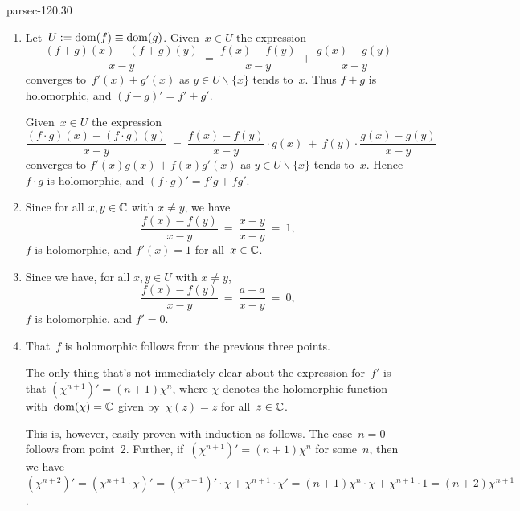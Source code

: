 \documentclass[b5page]{book}
\begin{document}
\begin{solution}{parsec-120.30}
\begin{enumerate}
\item[1.]
Let~$U:= \operatorname{dom}(f)\equiv\operatorname{dom}(g)$.
Given~$x\in U$ the expression
        \begin{equation*}
            \frac{(f+g)(x)-(f+g)(y)}{x-y}
            \ =\  \frac{f(x)-f(y)}{x-y}
            \ +\ \frac{g(x)-g(y)}{x-y}
        \end{equation*}
        converges to~$f'(x)+g'(x)$ as $y\in U\backslash\{x\}$
        tends to~$x$.  
Thus $f+g$ is holomorphic, and $(f+g)'=f'+g'$.

Given~$x\in U$ the expression
\begin{equation*}
            \frac{(f\cdot g)(x)-(f\cdot g)(y)}{x-y}
            \ =\  \frac{f(x)-f(y)}{x-y}\cdot g(x)
            \ +\ f(y)\cdot \frac{g(x)-g(y) }{x-y}
\end{equation*}
converges to $f'(x)g(x)+f(x)g'(x)$ as $y\in U\backslash\{x\}$
tends to~$x$. Hence~$f\cdot g$ is holomorphic, 
        and $(f\cdot g)' = f'g + fg'$.

\item[2.]
Since for all $x,y\in\mathbb{C}$ with $x\neq y$, 
        we have
\begin{equation*}
\frac{f(x)-f(y)}{x-y} \ = \ 
    \frac{x-y}{x-y} \ = \ 1,
\end{equation*}
$f$ is holomorphic, and $f'(x)=1$ for all~$x\in \mathbb{C}$.

\item[3.]
    Since we have, for all $x,y\in U$ with $x\neq y$,
\begin{equation*}
\frac{f(x)-f(y)}{x-y} \ = \ 
    \frac{a-a}{x-y} \ = \ 0,
\end{equation*}
$f$ is holomorphic, and $f'=0$.

\item[4.]
That~$f$ is holomorphic follows from the previous three points.

The only thing that's not immediately clear
about the expression for~$f'$
is that $(\chi^{n+1})'=(n+1)\chi^n$,
where $\chi$ denotes the holomorphic
function with~$\operatorname{dom}(\chi)=\mathbb{C}$
given by~$\chi(z)=z$ for all~$z\in \mathbb{C}$.

This is, however, easily proven with induction as follows.
The case~$n=0$ follows from point~2.
Further, if~$(\chi^{n+1})'=(n+1)\chi^n$
        for some~$n$,
        then we have~$(\chi^{n+2})'
        = (\chi^{n+1}\cdot\chi)'
        = (\chi^{n+1})'\cdot \chi + \chi^{n+1}\cdot\chi'
        = (n+1)\chi^n\cdot \chi + \chi^{n+1}\cdot 1
        = (n+2)\chi^{n+1}$.
\end{enumerate}
\end{solution}
\end{document}
